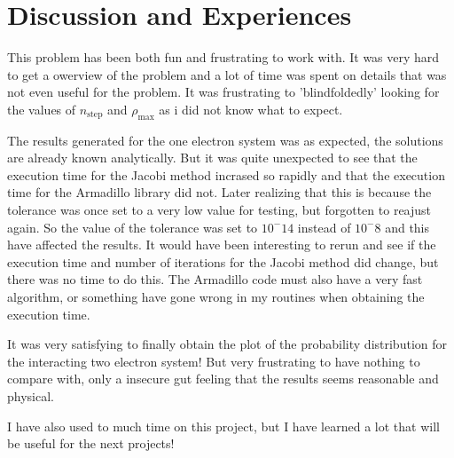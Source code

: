 \documentclass[11pt,a4wide]{article}
\begin{document}
\section*{Discussion and Experiences}

This problem has been both fun and frustrating to work with. It was very hard to get a owerview of the problem and a lot of time was spent on details that was not even useful for the problem. It was frustrating to 'blindfoldedly' looking for the values of $n_{\mathrm{step}}$ and $\rho_{\mathrm{max}}$ as i did not know what to expect. 

The results generated for the one electron system was as expected, the solutions are already known analytically. But it was quite unexpected to see that the execution time for the Jacobi method incrased so rapidly and that the execution time for the  Armadillo library did not. Later realizing that this is because the tolerance was once set to a very low value for testing, but forgotten to reajust again. So the value of the tolerance was set to $10^-14$ instead of $10^-8$ and this have affected the results. It would have been interesting to rerun and see if the execution time and number of iterations for the Jacobi method did change, but there was no time to do this. The Armadillo code must also have a very fast algorithm, or something have gone wrong in my routines when obtaining the execution time. 

It was very satisfying to finally obtain the plot of the probability distribution for the interacting two electron system! But very frustrating to have nothing to compare with, only a insecure gut feeling that the results seems reasonable and physical. 

I have also used to much time on this project, but I have learned a lot that will be useful for the next projects!
\end{document}
